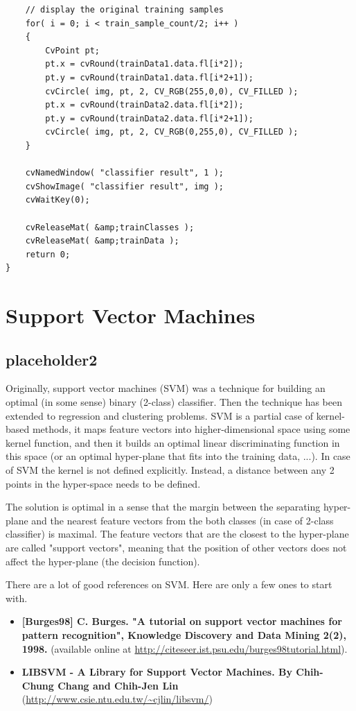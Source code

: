 \begin{lstlisting}
    // display the original training samples
    for( i = 0; i < train_sample_count/2; i++ )
    {
        CvPoint pt;
        pt.x = cvRound(trainData1.data.fl[i*2]);
        pt.y = cvRound(trainData1.data.fl[i*2+1]);
        cvCircle( img, pt, 2, CV_RGB(255,0,0), CV_FILLED );
        pt.x = cvRound(trainData2.data.fl[i*2]);
        pt.y = cvRound(trainData2.data.fl[i*2+1]);
        cvCircle( img, pt, 2, CV_RGB(0,255,0), CV_FILLED );
    }

    cvNamedWindow( "classifier result", 1 );
    cvShowImage( "classifier result", img );
    cvWaitKey(0);

    cvReleaseMat( &amp;trainClasses );
    cvReleaseMat( &amp;trainData );
    return 0;
}
\end{lstlisting}


\section{Support Vector Machines}

\subsection{placeholder2}

Originally, support vector machines (SVM) was a technique for building an optimal (in some sense) binary (2-class) classifier. Then the technique has been extended to regression and clustering problems. SVM is a partial case of kernel-based methods, it maps feature vectors into higher-dimensional space using some kernel function, and then it builds an optimal linear discriminating function in this space (or an optimal hyper-plane that fits into the training data, ...). In case of SVM the kernel is not defined explicitly. Instead, a distance between any 2 points in the hyper-space needs to be defined.

The solution is optimal in a sense that the margin between the separating hyper-plane and the nearest feature vectors from the both classes (in case of 2-class classifier) is maximal. The feature vectors that are the closest to the hyper-plane are called "support vectors", meaning that the position of other vectors does not affect the hyper-plane (the decision function).

There are a lot of good references on SVM. Here are only a few ones to start with.
\begin{itemize}
\item \textbf{[Burges98] C. Burges. "A tutorial on support vector machines for pattern recognition", Knowledge Discovery and Data Mining 2(2), 1998.} (available online at \url{http://citeseer.ist.psu.edu/burges98tutorial.html}).
\item \textbf{LIBSVM - A Library for Support Vector Machines. By Chih-Chung Chang and Chih-Jen Lin} (\url{http://www.csie.ntu.edu.tw/~cjlin/libsvm/})
\end{itemize}


